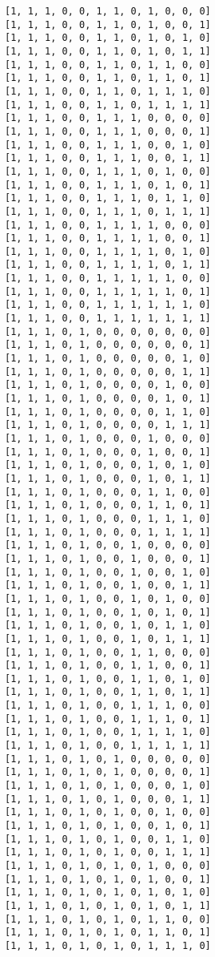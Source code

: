 \documentclass[11pt]{article}
\begin{document}
\begin{Verbatim}[commandchars=\\\{\}]
[1, 1, 1, 0, 0, 1, 1, 0, 1, 0, 0, 0]
[1, 1, 1, 0, 0, 1, 1, 0, 1, 0, 0, 1]
[1, 1, 1, 0, 0, 1, 1, 0, 1, 0, 1, 0]
[1, 1, 1, 0, 0, 1, 1, 0, 1, 0, 1, 1]
[1, 1, 1, 0, 0, 1, 1, 0, 1, 1, 0, 0]
[1, 1, 1, 0, 0, 1, 1, 0, 1, 1, 0, 1]
[1, 1, 1, 0, 0, 1, 1, 0, 1, 1, 1, 0]
[1, 1, 1, 0, 0, 1, 1, 0, 1, 1, 1, 1]
[1, 1, 1, 0, 0, 1, 1, 1, 0, 0, 0, 0]
[1, 1, 1, 0, 0, 1, 1, 1, 0, 0, 0, 1]
[1, 1, 1, 0, 0, 1, 1, 1, 0, 0, 1, 0]
[1, 1, 1, 0, 0, 1, 1, 1, 0, 0, 1, 1]
[1, 1, 1, 0, 0, 1, 1, 1, 0, 1, 0, 0]
[1, 1, 1, 0, 0, 1, 1, 1, 0, 1, 0, 1]
[1, 1, 1, 0, 0, 1, 1, 1, 0, 1, 1, 0]
[1, 1, 1, 0, 0, 1, 1, 1, 0, 1, 1, 1]
[1, 1, 1, 0, 0, 1, 1, 1, 1, 0, 0, 0]
[1, 1, 1, 0, 0, 1, 1, 1, 1, 0, 0, 1]
[1, 1, 1, 0, 0, 1, 1, 1, 1, 0, 1, 0]
[1, 1, 1, 0, 0, 1, 1, 1, 1, 0, 1, 1]
[1, 1, 1, 0, 0, 1, 1, 1, 1, 1, 0, 0]
[1, 1, 1, 0, 0, 1, 1, 1, 1, 1, 0, 1]
[1, 1, 1, 0, 0, 1, 1, 1, 1, 1, 1, 0]
[1, 1, 1, 0, 0, 1, 1, 1, 1, 1, 1, 1]
[1, 1, 1, 0, 1, 0, 0, 0, 0, 0, 0, 0]
[1, 1, 1, 0, 1, 0, 0, 0, 0, 0, 0, 1]
[1, 1, 1, 0, 1, 0, 0, 0, 0, 0, 1, 0]
[1, 1, 1, 0, 1, 0, 0, 0, 0, 0, 1, 1]
[1, 1, 1, 0, 1, 0, 0, 0, 0, 1, 0, 0]
[1, 1, 1, 0, 1, 0, 0, 0, 0, 1, 0, 1]
[1, 1, 1, 0, 1, 0, 0, 0, 0, 1, 1, 0]
[1, 1, 1, 0, 1, 0, 0, 0, 0, 1, 1, 1]
[1, 1, 1, 0, 1, 0, 0, 0, 1, 0, 0, 0]
[1, 1, 1, 0, 1, 0, 0, 0, 1, 0, 0, 1]
[1, 1, 1, 0, 1, 0, 0, 0, 1, 0, 1, 0]
[1, 1, 1, 0, 1, 0, 0, 0, 1, 0, 1, 1]
[1, 1, 1, 0, 1, 0, 0, 0, 1, 1, 0, 0]
[1, 1, 1, 0, 1, 0, 0, 0, 1, 1, 0, 1]
[1, 1, 1, 0, 1, 0, 0, 0, 1, 1, 1, 0]
[1, 1, 1, 0, 1, 0, 0, 0, 1, 1, 1, 1]
[1, 1, 1, 0, 1, 0, 0, 1, 0, 0, 0, 0]
[1, 1, 1, 0, 1, 0, 0, 1, 0, 0, 0, 1]
[1, 1, 1, 0, 1, 0, 0, 1, 0, 0, 1, 0]
[1, 1, 1, 0, 1, 0, 0, 1, 0, 0, 1, 1]
[1, 1, 1, 0, 1, 0, 0, 1, 0, 1, 0, 0]
[1, 1, 1, 0, 1, 0, 0, 1, 0, 1, 0, 1]
[1, 1, 1, 0, 1, 0, 0, 1, 0, 1, 1, 0]
[1, 1, 1, 0, 1, 0, 0, 1, 0, 1, 1, 1]
[1, 1, 1, 0, 1, 0, 0, 1, 1, 0, 0, 0]
[1, 1, 1, 0, 1, 0, 0, 1, 1, 0, 0, 1]
[1, 1, 1, 0, 1, 0, 0, 1, 1, 0, 1, 0]
[1, 1, 1, 0, 1, 0, 0, 1, 1, 0, 1, 1]
[1, 1, 1, 0, 1, 0, 0, 1, 1, 1, 0, 0]
[1, 1, 1, 0, 1, 0, 0, 1, 1, 1, 0, 1]
[1, 1, 1, 0, 1, 0, 0, 1, 1, 1, 1, 0]
[1, 1, 1, 0, 1, 0, 0, 1, 1, 1, 1, 1]
[1, 1, 1, 0, 1, 0, 1, 0, 0, 0, 0, 0]
[1, 1, 1, 0, 1, 0, 1, 0, 0, 0, 0, 1]
[1, 1, 1, 0, 1, 0, 1, 0, 0, 0, 1, 0]
[1, 1, 1, 0, 1, 0, 1, 0, 0, 0, 1, 1]
[1, 1, 1, 0, 1, 0, 1, 0, 0, 1, 0, 0]
[1, 1, 1, 0, 1, 0, 1, 0, 0, 1, 0, 1]
[1, 1, 1, 0, 1, 0, 1, 0, 0, 1, 1, 0]
[1, 1, 1, 0, 1, 0, 1, 0, 0, 1, 1, 1]
[1, 1, 1, 0, 1, 0, 1, 0, 1, 0, 0, 0]
[1, 1, 1, 0, 1, 0, 1, 0, 1, 0, 0, 1]
[1, 1, 1, 0, 1, 0, 1, 0, 1, 0, 1, 0]
[1, 1, 1, 0, 1, 0, 1, 0, 1, 0, 1, 1]
[1, 1, 1, 0, 1, 0, 1, 0, 1, 1, 0, 0]
[1, 1, 1, 0, 1, 0, 1, 0, 1, 1, 0, 1]
[1, 1, 1, 0, 1, 0, 1, 0, 1, 1, 1, 0]

\end{Verbatim}
\end{document}
